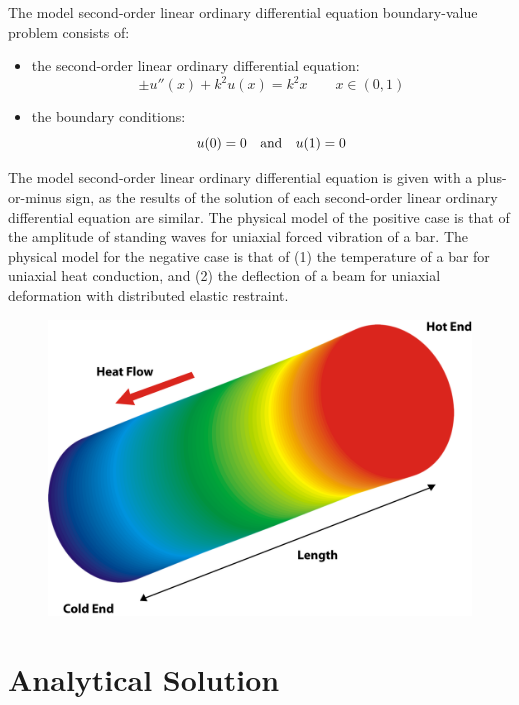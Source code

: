 \documentclass[10pt, reqno]{article}		%
\numberwithin{equation}{section}
\begin{document}
The model second-order linear ordinary differential equation boundary-value problem consists of:
\begin{itemize}
	\item the second-order linear ordinary differential equation:
	\begin{equation}
	\pm u''(x)+k^2u(x)=k^2x \qquad x \in (0, 1)
	\end{equation}
	\item the boundary conditions:
	\begin{equation}
	u(0) = 0 \quad \textnormal{and} \quad u(1) = 0 
	\end{equation}
\end{itemize}
The model second-order linear ordinary differential equation is given with a plus-or-minus sign, as the results of the solution of each second-order linear ordinary differential equation are similar. The physical model of the positive case is that of the amplitude of standing waves for uniaxial forced vibration of a bar. The physical model for the negative case is that of (1) the temperature of a bar for uniaxial heat conduction, and (2) the deflection of a beam for uniaxial deformation with distributed elastic restraint.

\vfill

\begin{figure}[H]
	\begin{center}
		\includegraphics[width = 0.7\linewidth]{model_problem_image}
	\end{center}
\end{figure}

\vspace{50pt}

\newpage

\section{Analytical Solution}
\end{document}
